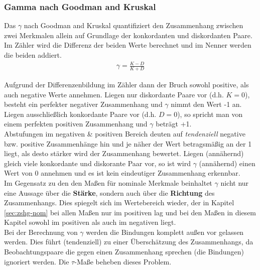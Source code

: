\documentclass[a4paper]{article}
\newcommand\dangersign[1][2ex]{%
  \renewcommand\stacktype{L}%
  \scaleto{\stackon[1.3pt]{\color{red}$\triangle$}{\tiny !}}{#1}%
}
\begin{document}
\clearpage

\subsubsection{Gamma nach Goodman and Kruskal}\label{sec:gamma}
Das $\gamma$ nach Goodman and Kruskal quantifiziert den Zusammenhang zwischen zwei Merkmalen allein auf Grundlage der konkordanten und diskordanten Paare. Im Zähler wird die Differenz der beiden Werte berechnet und im Nenner werden die beiden addiert.
\begin{align*}
    \gamma=\frac{K-D}{K+D}
\end{align*}

Aufgrund der Differenzenbildung im Zähler dann der Bruch sowohl positive, als auch negative Werte annehmen. Liegen nur diskordante Paare vor (d.h. $K = 0$), besteht ein perfekter negativer Zusammenhang und $\gamma$ nimmt den Wert -1 an. Liegen ausschließlich konkordante Paare vor (d.h. $D = 0$), so spricht man von einem perfekten positiven Zusammenhang und $\gamma$ beträgt +1.\\
Abstufungen im negativen \& positiven Bereich deuten auf \textit{tendenziell} negative bzw. positive Zusammenhänge hin und je näher der Wert betragsmäßig an der 1 liegt, als desto stärker wird der Zusammenhang bewertet. Liegen (annähernd) gleich viele konkordante und diskorante Paar vor, so ist wird $\gamma$ (annähernd) einen Wert von 0 annehmen und es ist kein eindeutiger Zusammenhang erkennbar.\\

\noindent \dangersign[3ex] Im Gegensatz zu den den Maßen für nominale Merkmale beinhaltet $\gamma$ nicht nur eine Aussage über die \textbf{Stärke}, sondern auch über die \textbf{Richtung} des Zusammenhangs. Dies spiegelt sich im Wertebereich wieder, der in Kapitel \ref{sec:zshg-nom} bei allen Maßen nur im positiven lag und bei den Maßen in diesem Kapitel sowohl im positiven als auch im negativen liegt.\\

\noindent \dangersign[3ex] Bei der Berechnung von $\gamma$ werden die Bindungen komplett außen vor gelassen werden. Dies führt (tendenziell) zu einer Überschätzung des Zusammenhangs, da Beobachtungspaare die gegen einen Zusammenhang sprechen (die Bindungen) ignoriert werden. Die $\tau$-Maße beheben dieses Problem.\\

\noindent  {}
\end{document}
